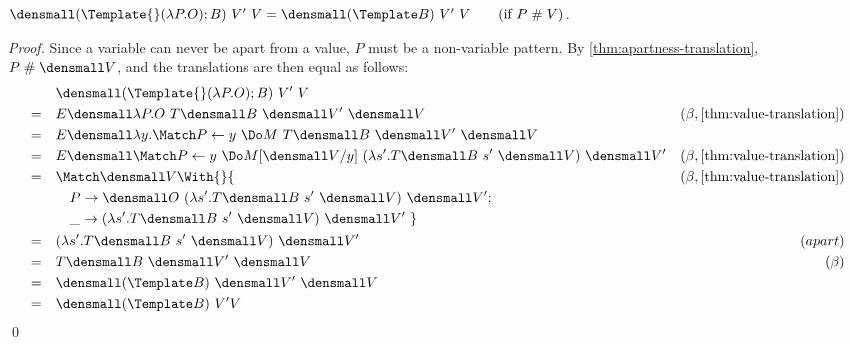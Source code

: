 \begin{lemma}
  \label{thm:template-apart}

  $\den{(\Template{} (\lambda P. O); B) ~ V' ~ V} = \den{(\Template B) ~ V' ~ V}
  \qquad (\text{if } P \apart V)$.
\end{lemma}
\begin{proof}
  Since a variable can never be apart from a value, $P$ must be a non-variable pattern.
  By \cref{thm:apartness-translation}, $P \apart \den{V}$, and the translations are then equal as follows:
  \begin{align*}
    & \quad \den{(\Template{} (\lambda P. O); B) ~ V' ~ V} \\
    =& \quad E\den{\lambda P. O} ~T\den{B} ~\den{V'} ~\den{V} & (\beta,\cref{thm:value-translation}) \\
    =&\quad E\den{\lambda y. \Match P \gets y ~\Do M} ~T\den{B} ~\den{V'} ~\den{V} \\
    =&\quad E\den{\Match P \gets y ~\Do M}\subst{y}{\den{V}} ~(\lambda s'. T\den{B} ~s' ~\den{V}) ~\den{V'} & (\beta, \cref{thm:value-translation}) \\
    =& \quad
    \begin{aligned}[t]
      &\Match \den{V} \With{} \{ \\
      &\quad P \to \den{O}~(\lambda s'. T\den{B} ~s' ~\den{V})~\den{V'}; \\
      &\quad \_ \to (\lambda s'. T\den{B} ~s' ~\den{V})~\den{V'}
      ~\}
    \end{aligned}
    & (\beta, \cref{thm:value-translation}) \\
    =& \quad (\lambda s'. T\den{B} ~s' ~\den{V}) ~\den{V'} & (apart)\\
    =& \quad T\den{B} ~ \den{V'} ~ \den{V} & (\beta) \\
    =& \quad \den{(\Template B)} ~ \den{V'} ~ \den{V} \\
    =& \quad \den{(\Template B) ~ V' V}
  \end{align*}
  \qed
\end{proof}


